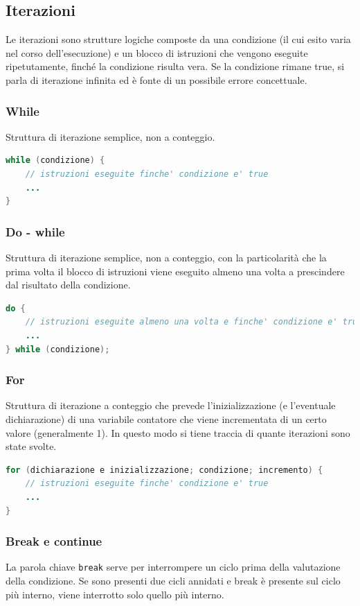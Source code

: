 \documentclass[a4paper]{article}
\begin{document}
\subsection{Iterazioni}
Le iterazioni sono strutture logiche composte da una condizione (il cui esito varia nel corso dell'esecuzione) e un blocco di
istruzioni che vengono eseguite ripetutamente, finché la condizione risulta vera. Se la condizione rimane true, si parla di
iterazione infinita ed è fonte di un possibile errore concettuale.

\subsubsection*{While}
Struttura di iterazione semplice, non a conteggio.
\begin{lstlisting}[language=Java]
while (condizione) {
	// istruzioni eseguite finche' condizione e' true
	...
}
\end{lstlisting}

\subsubsection*{Do - while}
Struttura di iterazione semplice, non a conteggio, con la particolarità che la prima volta il blocco di istruzioni viene eseguito
almeno una volta a prescindere dal risultato della condizione.
\begin{lstlisting}[language=Java]
do {
	// istruzioni eseguite almeno una volta e finche' condizione e' true
	...
} while (condizione);
\end{lstlisting}

\subsubsection*{For}
Struttura di iterazione a conteggio che prevede l'inizializzazione (e l'eventuale dichiarazione) di una variabile contatore che
viene incrementata di un certo valore (generalmente 1). In questo modo si tiene traccia di quante iterazioni sono state svolte.
\begin{lstlisting}[language=Java]
for (dichiarazione e inizializzazione; condizione; incremento) {
	// istruzioni eseguite finche' condizione e' true
	...
}
\end{lstlisting}

\subsubsection*{Break e continue}
La parola chiave \verb|break| serve per interrompere un ciclo prima della valutazione della condizione. Se sono presenti due cicli annidati
e break è presente sul ciclo più interno, viene interrotto solo quello più interno.
\end{document}

